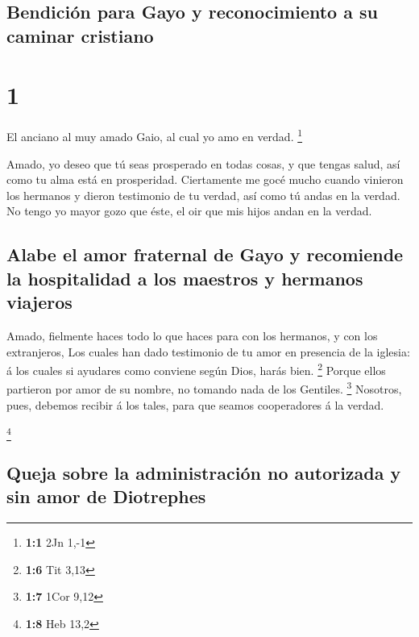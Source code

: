 \hypertarget{bendiciuxf3n-para-gayo-y-reconocimiento-a-su-caminar-cristiano}{%
\subsection{Bendición para Gayo y reconocimiento a su caminar
cristiano}\label{bendiciuxf3n-para-gayo-y-reconocimiento-a-su-caminar-cristiano}}

\hypertarget{section}{%
\section{1}\label{section}}

 El anciano al muy amado Gaio, al cual yo amo en verdad.
\footnote{\textbf{1:1} 2Jn 1,-1}

 Amado, yo deseo que tú seas prosperado en todas cosas, y
que tengas salud, así como tu alma está en prosperidad. 
Ciertamente me gocé mucho cuando vinieron los hermanos y dieron
testimonio de tu verdad, así como tú andas en la verdad.  No
tengo yo mayor gozo que éste, el oir que mis hijos andan en la verdad.

\hypertarget{alabe-el-amor-fraternal-de-gayo-y-recomiende-la-hospitalidad-a-los-maestros-y-hermanos-viajeros}{%
\subsection{Alabe el amor fraternal de Gayo y recomiende la hospitalidad
a los maestros y hermanos
viajeros}\label{alabe-el-amor-fraternal-de-gayo-y-recomiende-la-hospitalidad-a-los-maestros-y-hermanos-viajeros}}

 Amado, fielmente haces todo lo que haces para con los
hermanos, y con los extranjeros,  Los cuales han dado
testimonio de tu amor en presencia de la iglesia: á los cuales si
ayudares como conviene según Dios, harás bien. \footnote{\textbf{1:6}
  Tit 3,13}  Porque ellos partieron por amor de su nombre,
no tomando nada de los Gentiles. \footnote{\textbf{1:7} 1Cor 9,12}
 Nosotros, pues, debemos recibir á los tales, para que
seamos cooperadores á la verdad.

\footnote{\textbf{1:8} Heb 13,2}

\hypertarget{queja-sobre-la-administraciuxf3n-no-autorizada-y-sin-amor-de-diotrephes}{%
\subsection{Queja sobre la administración no autorizada y sin amor de
Diotrephes}\label{queja-sobre-la-administraciuxf3n-no-autorizada-y-sin-amor-de-diotrephes}}

